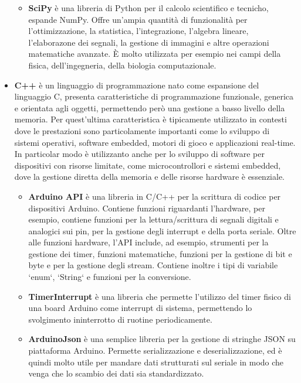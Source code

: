 \documentclass[12pt,a4paper,openright,twoside]{book}
\begin{document}
\begin{itemize}[noitemsep]
\begin{itemize}[noitemsep]
            \item \textbf{SciPy} è una libreria di Python per il calcolo scientifico e tecnicho, espande NumPy. Offre un'ampia quantità di funzionalità per l'ottimizzazione, la statistica, l'integrazione, l'algebra lineare, l'elaborazone dei segnali, la gestione di immagini e altre operazioni matematiche avanzate. È molto utilizzata per esempio nei campi della fisica, dell'ingegneria, della biologia computazionale.
        \end{itemize}
        \item \textbf{C++} è un linguaggio di programmazione nato come espansione del linguaggio C, presenta caratteristiche di programmazione funzionale, generica e orientata agli oggetti, permettendo però una gestione a basso livello della memoria. Per quest'ultima caratteristica è tipicamente utilizzato in contesti dove le prestazioni sono particolamente importanti come lo sviluppo di sistemi operativi, software embedded, motori di gioco e applicazioni real-time. In particolar modo è utilizzanto anche per lo sviluppo di software per dispositivi con risorse limitate, come microcontrollori e sistemi embedded, dove la gestione diretta della memoria e delle risorse hardware è essenziale.
        \begin{itemize}[noitemsep]
            \item \textbf{Arduino API} è una libreria in C/C++ per la scrittura di codice per dispositivi Arduino. Contiene funzioni riguardanti l'hardware, per esempio, contiene funzioni per la lettura/scrittura di segnali digitali e analogici sui pin, per la gestione degli interrupt e della porta seriale. Oltre alle funzioni hardware, l'API include, ad esempio, strumenti per la gestione dei timer, funzioni matematiche, funzioni per la gestione di bit e byte e per la gestione degli stream. Contiene inoltre i tipi di variabile `enum`, `String` e funzioni per la conversione.
            \item \textbf{TimerInterrupt} è una libreria che permette l'utilizzo del timer fisico di una board Arduino come interrupt di sistema, permettendo lo svolgimento ininterrotto di ruotine periodicamente.
            \item \textbf{ArduinoJson} è una semplice libreria per la gestione di stringhe JSON su piattaforma Arduino. Permette serializzazione e deserializzazione, ed è quindi molto utile per mandare dati strutturati sul seriale in modo che venga che lo scambio dei dati sia standardizzato.
        \end{itemize}
    \end{itemize}
\end{document}
